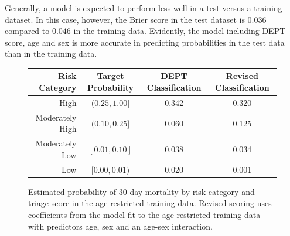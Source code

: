 Generally, a model is expected to perform less well in a test versus a training dataset.  In this case, however, the Brier score in the test dataset is $0.036$ compared to $0.046$ in the training data.  Evidently, the model including DEPT score, age and sex is more accurate in predicting probabilities in the test data than in the training data. 

\begin{figure}[ht]
  \centering
  \begin{tabular}{rccc}
    \hline
  Risk Category & Target Probability & DEPT Classification & Revised Classification \\
    \hline
    High & $ (0.25, 1.00]$ & 0.342 & 0.320 \\
  Moderately High & $(0.10, 0.25]$ & 0.060 & 0.125 \\
  Moderately Low & $ [0.01, 0.10]$ & 0.038 & 0.034 \\
  Low & $ [0.00, 0.01)$ & 0.020 & 0.001 \\
   \hline
\end{tabular}
\caption{Estimated probability of 30-day mortality by risk category and triage score in the age-restricted training data. Revised scoring uses coefficients from the model fit to the age-restricted training data with predictors age, sex and an age-sex interaction.}
\label{figure:mort30RatesByColorValid}
\end{figure}

